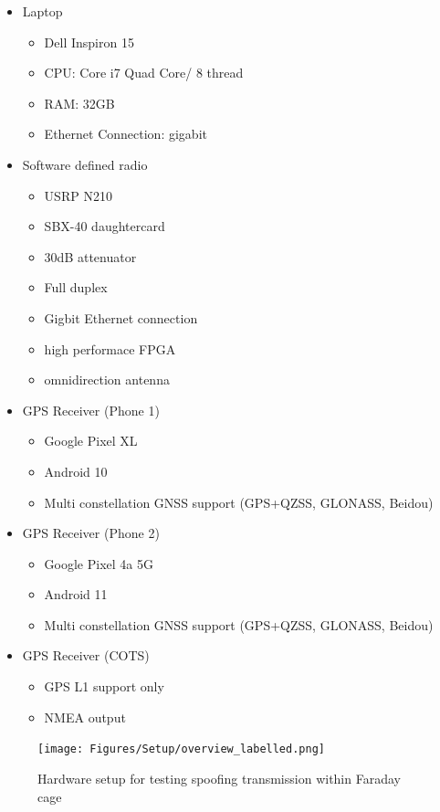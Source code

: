 \begin{itemize}
    \item Laptop
    \begin{itemize}
        \item Dell Inspiron 15
        \item CPU: Core i7 Quad Core/ 8 thread
        \item RAM: 32GB
        \item Ethernet Connection: gigabit
    \end{itemize}
    \item Software defined radio
    \begin{itemize}
        \item USRP N210
        \item SBX-40 daughtercard
        \item 30dB attenuator
        \item Full duplex
        \item Gigbit Ethernet connection
        \item high performace FPGA
        \item omnidirection antenna
    \end{itemize}
    \item GPS Receiver (Phone 1)
    \begin{itemize}
        \item Google Pixel XL
        \item Android 10
        \item Multi constellation GNSS support (GPS+QZSS, GLONASS, Beidou)
    \end{itemize}
    \item GPS Receiver (Phone 2)
    \begin{itemize}
        \item Google Pixel 4a 5G
        \item Android 11
        \item Multi constellation GNSS support (GPS+QZSS, GLONASS, Beidou)
    \end{itemize}
    \item GPS Receiver (COTS)
    \begin{itemize}
        \item GPS L1 support only
        \item NMEA output
    \end{itemize}
\end{itemize}

\begin{figure}[h]
    \begin{centering}
        \texttt{[image: Figures/Setup/overview\_labelled.png]}
        \caption{Hardware setup for testing spoofing transmission within Faraday cage}
    \label{fig:HardwareSetup}
    \end{centering}
\end{figure}

